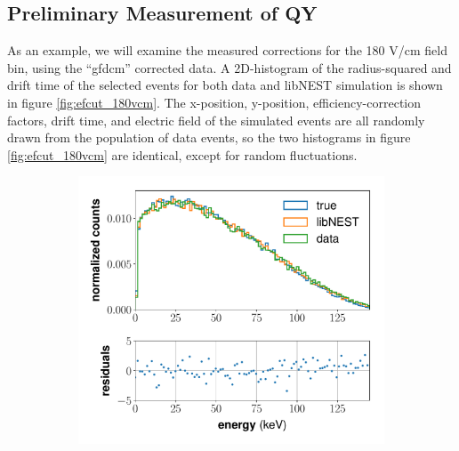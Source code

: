 \subsection{Preliminary Measurement of QY}\label{sec:qyprelim}
As an example, we will examine the measured corrections for the 180 V/cm field bin, using the ``gfdcm'' corrected data. A 2D-histogram of the radius-squared and drift time of the selected events for both data and libNEST simulation is shown in figure \ref{fig:efcut_180vcm}. The x-position, y-position, efficiency-correction factors, drift time, and electric field of the simulated events are all randomly drawn from the population of data events, so the two histograms in figure \ref{fig:efcut_180vcm} are identical, except for random fluctuations. 
\begin{figure}[h!]
\centering
\begin{subfigure}{0.5\textwidth}
  \centering
  \includegraphics[width=\textwidth]{Figures/yields_corrections/C14_spectrum_gfdcm_180Vcm_prelim.pdf}
  \caption{}
  \label{fig:c14spec_180_prelim}
\end{subfigure}%
\begin{subfigure}{0.5\textwidth}
  \centering

\end{subfigure}
\end{figure}
